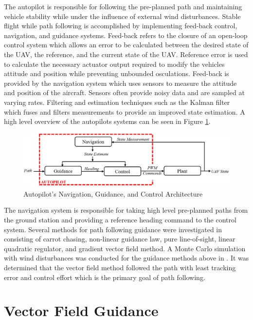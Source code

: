 \documentclass[numbered,pdftex]{ohio-etd}
\begin{document}
The autopilot is responsible for following the pre-planned path and maintaining vehicle stability while under the influence of external wind disturbances. Stable flight while path following is accomplished by implementing feed-back control, navigation, and guidance systems. Feed-back refers to the closure of an open-loop control system which allows an error to be calculated between the desired state of the UAV, the reference, and the current state of the UAV. Reference error is used to calculate the necessary actuator output required to modify the vehicles attitude and position while preventing unbounded osculations. Feed-back is provided by the navigation system which uses sensors to measure the attitude and position of the aircraft. Sensors often provide noisy data and are sampled at varying rates. Filtering and estimation techniques such as the Kalman filter which fuses and filters measurements to provide an improved state estimation. A high level overview of the autopilots systems can be seen in Figure \ref{fig:autopilotloops}.

\begin{figure}
	\centering
	\includegraphics[width=15cm]{PaperFigures/autopilotLoops}
	\caption{Autopilot's Navigation, Guidance, and Control Architecture}
	\label{fig:autopilotloops}
\end{figure}

The navigation system is responsible for taking high level pre-planned paths from the ground station and providing a reference heading command to the control system. Several methods for path following guidance were investigated in \cite{sujit_unmanned_2014} consisting of carrot chasing, non-linear guidance law, pure line-of-sight, linear quadratic regulator, and gradient vector field method. A Monte Carlo simulation with wind disturbances was conducted for the guidance methods above in \cite{sujit_unmanned_2014}. It was determined that the vector field method followed the path with least tracking error and control effort which is the primary goal of path following. 


\section{Vector Field Guidance}
\end{document}
